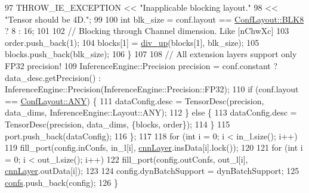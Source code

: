 \begin{DoxyCode}
97                 THROW\_IE\_EXCEPTION << \textcolor{stringliteral}{"Inapplicable blocking layout."}
98                                    << \textcolor{stringliteral}{"Tensor should be 4D."};
99 
100             \textcolor{keywordtype}{int} blk\_size = conf.layout == \hyperlink{classInferenceEngine_1_1Extensions_1_1Cpu_1_1ExtLayerBase_a1258a8d209e0249e0b1717618352ddfba6023b7e0a175b8cf9cbcec3ac3cbf93d}{ConfLayout::BLK8} ? 8 : 16;
101 
102             \textcolor{comment}{// Blocking through Channel dimension. Like [nChwXc]}
103             order.push\_back(1);
104             blocks[1] = \hyperlink{namespaceInferenceEngine_1_1Extensions_1_1Cpu_a979bf0275746a13e636116a432953b15}{div\_up}(blocks[1], blk\_size);
105             blocks.push\_back(blk\_size);
106         \}
107 
108         \textcolor{comment}{// All extension layers support only FP32 precision!}
109         InferenceEngine::Precision precision = conf.constant ? data\_desc.getPrecision() : 
      InferenceEngine::Precision(InferenceEngine::Precision::FP32);
110         \textcolor{keywordflow}{if} (conf.layout == \hyperlink{classInferenceEngine_1_1Extensions_1_1Cpu_1_1ExtLayerBase_a1258a8d209e0249e0b1717618352ddfba8e1bde3c3d303163521522cf1d62f21f}{ConfLayout::ANY}) \{
111             dataConfig.desc = TensorDesc(precision, data\_dims, InferenceEngine::Layout::ANY);
112         \} \textcolor{keywordflow}{else} \{
113             dataConfig.desc = TensorDesc(precision, data\_dims, \{blocks, order\});
114         \}
115         port.push\_back(dataConfig);
116     \};
117 
118     \textcolor{keywordflow}{for} (\textcolor{keywordtype}{int} i = 0; i < in\_l.size(); i++)
119         fill\_port(config.inConfs, in\_l[i], \hyperlink{classInferenceEngine_1_1Extensions_1_1Cpu_1_1ExtLayerBase_a1074cdccacb9e9ca6eec01bbc2f7ca4a}{cnnLayer}.insData[i].lock());
120 
121     \textcolor{keywordflow}{for} (\textcolor{keywordtype}{int} i = 0; i < out\_l.size(); i++)
122         fill\_port(config.outConfs, out\_l[i], \hyperlink{classInferenceEngine_1_1Extensions_1_1Cpu_1_1ExtLayerBase_a1074cdccacb9e9ca6eec01bbc2f7ca4a}{cnnLayer}.outData[i]);
123 
124     config.dynBatchSupport = dynBatchSupport;
125     \hyperlink{classInferenceEngine_1_1Extensions_1_1Cpu_1_1ExtLayerBase_a2a9f897007f2eb00e295cd25fd23fd5d}{confs}.push\_back(config);
126 \}
\end{DoxyCode}
